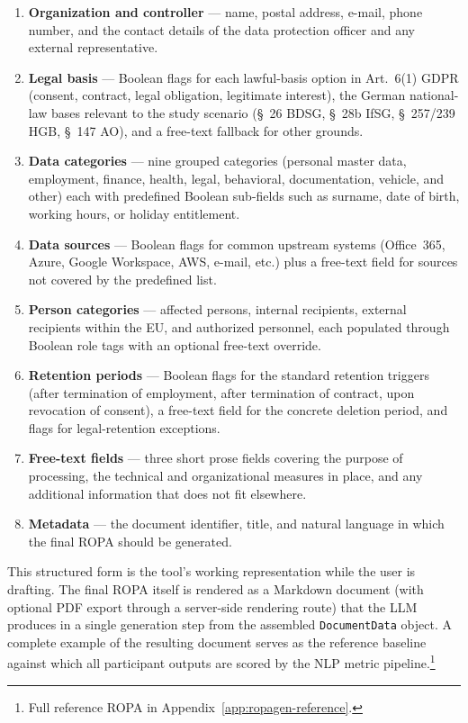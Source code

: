 \begin{enumerate}\sloppy
    \item \textbf{Organization and controller} --- name, postal address, e-mail, phone number, and the contact details of the data protection officer and any external representative.
    \item \textbf{Legal basis} --- Boolean flags for each lawful-basis option in Art.~6(1) GDPR (consent, contract, legal obligation, legitimate interest), the German national-law bases relevant to the study scenario (\S~26 BDSG, \S~28b IfSG, \S~257/239 HGB, \S~147 AO), and a free-text fallback for other grounds.
    \item \textbf{Data categories} --- nine grouped categories (personal master data, employment, finance, health, legal, behavioral, documentation, vehicle, and other) each with predefined Boolean sub-fields such as surname, date of birth, working hours, or holiday entitlement.
    \item \textbf{Data sources} --- Boolean flags for common upstream systems (Office~365, Azure, Google Workspace, AWS, e-mail, etc.) plus a free-text field for sources not covered by the predefined list.
    \item \textbf{Person categories} --- affected persons, internal recipients, external recipients within the EU, and authorized personnel, each populated through Boolean role tags with an optional free-text override.
    \item \textbf{Retention periods} --- Boolean flags for the standard retention triggers (after termination of employment, after termination of contract, upon revocation of consent), a free-text field for the concrete deletion period, and flags for legal-retention exceptions.
    \item \textbf{Free-text fields} --- three short prose fields covering the purpose of processing, the technical and organizational measures in place, and any additional information that does not fit elsewhere.
    \item \textbf{Metadata} --- the document identifier, title, and natural language in which the final ROPA should be generated.
\end{enumerate}

This structured form is the tool's working representation while the user is drafting. The final ROPA itself is rendered as a Markdown document (with optional PDF export through a server-side rendering route) that the LLM produces in a single generation step from the assembled \texttt{DocumentData} object. A complete example of the resulting document serves as the reference baseline against which all participant outputs are scored by the NLP metric pipeline.\footnote{Full reference ROPA in Appendix~\ref{app:ropagen-reference}.}

